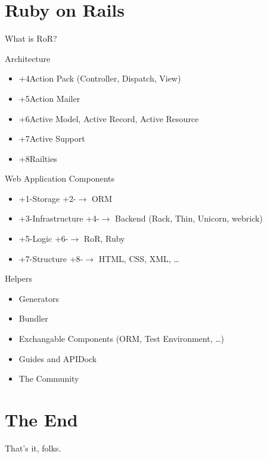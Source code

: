 \documentclass[style=husky,display=slides,clock]{powerdot}
\begin{document}
\section{Ruby on Rails}
\begin{slide}{What is RoR?}
	\centering
\end{slide}
\begin{slide}{Architecture}
	\centering
	\pause
	\pause
	\begin{itemize}
		\item \onslide+{4}{Action Pack (Controller, Dispatch, View)}
		\item \onslide+{5}{Action Mailer}
		\item \onslide+{6}{Active Model, Active Record, Active Resource}
		\item \onslide+{7}{Active Support}
		\item \onslide+{8}{Railties}
	\end{itemize}
\end{slide}
\begin{slide}{Web Application Components}
	\centering
	\begin{itemize}
		\item \onslide+{1-}{Storage} \onslide+{2-}{$\rightarrow$ ORM}
		\item \onslide+{3-}{Infrastructure} \onslide+{4-}{$\rightarrow$ Backend (Rack, Thin, Unicorn, webrick)}
		\item \onslide+{5-}{Logic} \onslide+{6-}{$\rightarrow$ RoR, Ruby}
		\item \onslide+{7-}{Structure} \onslide+{8-}{$\rightarrow$ HTML, CSS, XML, \ldots }
	\end{itemize}
\end{slide}
\begin{slide}{Helpers}
	\centering
	\begin{itemize}[type=1]
		\item Generators
		\item Bundler
		\item Exchangable Components (ORM, Test Environment, \ldots )
		\item Guides and APIDock
		\item The Community
	\end{itemize}
\end{slide}
\section[tocsection=hidden,slide=false]{The End}
\begin{emptyslide}{}
	\centering
	\Huge{That's it, folks.}
\end{emptyslide}
\end{document}
